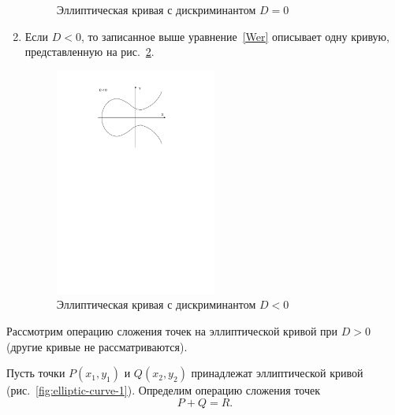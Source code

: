 \begin{enumerate}
\begin{figure}[!ht]
            \caption{Эллиптическая кривая с дискриминантом $D = 0$\label{fig:elliptic-curve-2}}
        \end{figure}
    \item Если $D<0$, то записанное выше уравнение~\ref{Wer} описывает одну кривую, представленную на рис.~\ref{fig:elliptic-curve-3}.
        \begin{figure}[!ht]
        	\centering
        	\includegraphics[width=0.5\textwidth]{pic/elliptic-curve-3}
            \caption{Эллиптическая кривая с дискриминантом $D < 0$\label{fig:elliptic-curve-3}}
        \end{figure}
\end{enumerate}

Рассмотрим операцию сложения точек на эллиптической кривой при $D>0$ (другие кривые не рассматриваются).

Пусть точки $P(x_1, y_1)$ и $Q(x_2, y_2)$ принадлежат эллиптической кривой (рис.~\ref{fig:elliptic-curve-1}). Определим операцию сложения точек
    \[ P + Q = R. \]


